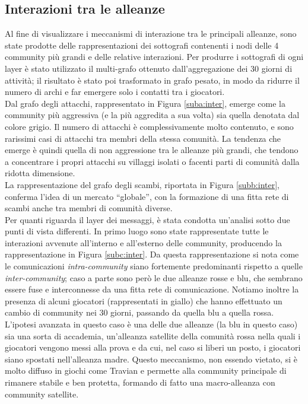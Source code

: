 \subsection{Interazioni tra le alleanze}
Al fine di visualizzare i meccanismi di interazione tra le principali alleanze, sono state prodotte delle rappresentazioni dei sottografi contenenti i nodi delle 4 community più grandi e delle relative interazioni. Per produrre i sottografi di ogni layer è stato utilizzato il multi-grafo ottenuto dall'aggregazione dei 30 giorni di attività; il risultato è stato poi trasformato in grafo pesato, in modo da ridurre il numero di archi e far emergere solo i contatti tra i giocatori.\\
Dal grafo degli attacchi, rappresentato in Figura \ref{suba:inter}, emerge come la community più aggressiva (e la più aggredita a sua volta) sia quella denotata dal colore grigio. Il numero di attacchi è complessivamente molto contenuto, e sono rarissimi casi di attacchi tra membri della stessa comunità. La tendenza che emerge è quindi quella di non aggressione tra le alleanze più grandi, che tendono a concentrare i propri attacchi su villaggi isolati o facenti parti di comunità dalla ridotta dimensione.\\
La rappresentazione del grafo degli scambi, riportata in Figura \ref{subb:inter}, conferma l'idea di un mercato “globale”, con la formazione di una fitta rete di scambi anche tra membri di comunità diverse.\\
Per quanti riguarda il layer dei messaggi, è stata condotta un'analisi sotto due punti di vista differenti. In primo luogo sono state rappresentate tutte le interazioni avvenute all'interno e all'esterno delle community, producendo la rappresentazione in Figura \ref{subc:inter}. Da questa rappresentazione si nota come le comunicazioni \textit{intra-community} siano fortemente predominanti rispetto a quelle \textit{inter-community}; caso a parte sono però le due alleanze rosse e blu, che sembrano essere fuse e interconnesse da una fitta rete di comunicazione. Notiamo inoltre la presenza di alcuni giocatori (rappresentati in giallo) che hanno effettuato un cambio di community nei 30 giorni, passando da quella blu a quella rossa. L'ipotesi avanzata in questo caso è una delle due alleanze (la blu in questo caso) sia una sorta di accademia, un'alleanza satellite della comunità rossa nella quali i giocatori vengono messi alla prova e da cui, nel caso si liberi un posto, i giocatori siano spostati nell'alleanza madre. Questo meccanismo, non essendo vietato, si è molto diffuso in giochi come Travian e permette alla community principale di rimanere stabile e ben protetta, formando di fatto una macro-alleanza con community satellite.\\

